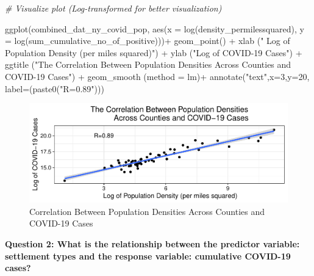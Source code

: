 \documentclass[
  12pt,
]{article}
\newenvironment{Shaded}{\begin{snugshade}}{\end{snugshade}}
\newcommand{\AttributeTok}[1]{\textcolor[rgb]{0.77,0.63,0.00}{#1}}
\newcommand{\CommentTok}[1]{\textcolor[rgb]{0.56,0.35,0.01}{\textit{#1}}}
\newcommand{\DecValTok}[1]{\textcolor[rgb]{0.00,0.00,0.81}{#1}}
\newcommand{\FunctionTok}[1]{\textcolor[rgb]{0.00,0.00,0.00}{#1}}
\newcommand{\NormalTok}[1]{#1}
\newcommand{\SpecialCharTok}[1]{\textcolor[rgb]{0.00,0.00,0.00}{#1}}
\newcommand{\StringTok}[1]{\textcolor[rgb]{0.31,0.60,0.02}{#1}}
\begin{document}
\begin{Shaded}
\begin{Highlighting}[]
\CommentTok{\# Visualize plot (Log{-}transformed for better visualization)}

\FunctionTok{ggplot}\NormalTok{(combined\_dat\_ny\_covid\_pop, }\FunctionTok{aes}\NormalTok{(}\AttributeTok{x =} \FunctionTok{log}\NormalTok{(density\_permilessquared), }\AttributeTok{y =} \FunctionTok{log}\NormalTok{(sum\_cumulative\_no\_of\_positive)))}\SpecialCharTok{+}
  \FunctionTok{geom\_point}\NormalTok{() }\SpecialCharTok{+}
  \FunctionTok{xlab}\NormalTok{ (}\StringTok{" Log of Population Density (per miles squared)"}\NormalTok{) }\SpecialCharTok{+}
  \FunctionTok{ylab}\NormalTok{ (}\StringTok{"Log of COVID{-}19 Cases"}\NormalTok{) }\SpecialCharTok{+}
  \FunctionTok{ggtitle}\NormalTok{ (}\StringTok{"The Correlation Between Population Densities}
\StringTok{           Across Counties and COVID{-}19 Cases"}\NormalTok{) }\SpecialCharTok{+}
  \FunctionTok{geom\_smooth}\NormalTok{ (}\AttributeTok{method =} \StringTok{\textquotesingle{}lm\textquotesingle{}}\NormalTok{)}\SpecialCharTok{+}
  \FunctionTok{annotate}\NormalTok{(}\StringTok{"text"}\NormalTok{,}\AttributeTok{x=}\DecValTok{3}\NormalTok{,}\AttributeTok{y=}\DecValTok{20}\NormalTok{, }\AttributeTok{label=}\NormalTok{(}\FunctionTok{paste0}\NormalTok{(}\StringTok{"R=0.89"}\NormalTok{)))}
\end{Highlighting}
\end{Shaded}

\begin{figure}

\includegraphics{EDA_Final_Group_Project_files/figure-latex/unnamed-chunk-23-1} \hfill{}

\caption{Correlation Between Population Densities Across Counties and COVID-19 Cases}\label{fig:unnamed-chunk-23}
\end{figure}

\textbf{Question 2: What is the relationship between the predictor
variable: settlement types and the response variable: cumulative
COVID-19 cases?}
\end{document}
